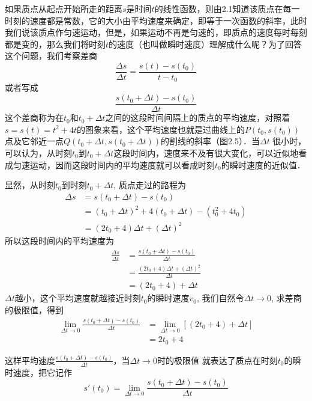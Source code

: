 \begin{analyze}
    如果质点从起点开始所走的距离$s$是时间$t$的线性函数，则由2.1知道该质点在每一时刻的速度都是常数，它的大小由平均速度来确定，即等于一次函数的斜率，此时我们说该质点作匀速运动，但是，如果运动不再是匀速的，即质点的速度每时每刻都是变的，那么我们将时刻$t$的速度（也叫做瞬时速度）理解成什么呢？为了回答这个问题，我们考察差商
\[\frac{\Delta s}{\Delta t}=\frac{s(t)-s(t_0)}{t-t_0}\]
或者写成\[\frac{s(t_0+\Delta t)-s(t_0)}{\Delta t}\]
这个差商称为在$t_0$和$t_0+\Delta t$之间的这段时间间隔上的质点的平均速度，对照着$s=s(t)=t^2+4t$的图象来看，这个平均速度也就是过曲线上的$P(t_0,s(t_0))$
点及它邻近一点$Q(t_0+\Delta t,s(t_0+\Delta t))$的割线的斜率（图2.5）．当$\Delta t$ 很小时，可以认为，从时刻$t_0$到$t_0+\Delta t$这段时间内，速度来不及有很大变化，可以近似地看成匀速运动，因而这段时间内的平均速度就可以看成时刻$t_0$的瞬时速度的近似值．

\begin{figure}[htp]
    \centering

    \caption{}
\end{figure}



显然，从时刻$t_0$到时刻$t_0+\Delta t$, 质点走过的路程为
\begin{align*}
    \Delta s&=s(t_0+\Delta t)-s(t_0)\\
    &=(t_0+\Delta t)^2+4(t_0+\Delta t)-(t^2_0+4t_0)\\
    &=(2t_0+4)\Delta t+(\Delta t)^2
\end{align*}
所以这段时间内的平均速度为
\begin{align*}
    \frac{\Delta s}{\Delta t}&=\frac{s(t_0+\Delta t)-s(t_0)}{\Delta t}\\
    &=\frac{(2t_0+4)\Delta t+(\Delta t)^2}{\Delta t}\\
    &=(2t_0+4)+\Delta t
\end{align*}
$\Delta t$越小，这个平均速度就越接近时刻$t_0$的瞬时速度$v_0$, 我们自然令$\Delta t\to 0$, 求差商的极限值，得到
\begin{align*}
    \lim_{\Delta t\to 0}\frac{s(t_0+\Delta t)-s(t_0)}{\Delta t}&= \lim_{\Delta t\to 0}[(2t_0+4)+\Delta t]\\
    &=2t_0+4
\end{align*}

这样平均速度$\frac{s(t_0+\Delta t)-s(t_0)}{\Delta t}$，当$\Delta t\to 0$时的极限值
就表达了质点在时刻$t_0$的瞬时速度，把它记作
\[s'(t_0)=   \lim_{\Delta t\to 0}\frac{s(t_0+\Delta t)-s(t_0)}{\Delta t}\]
\end{analyze}

